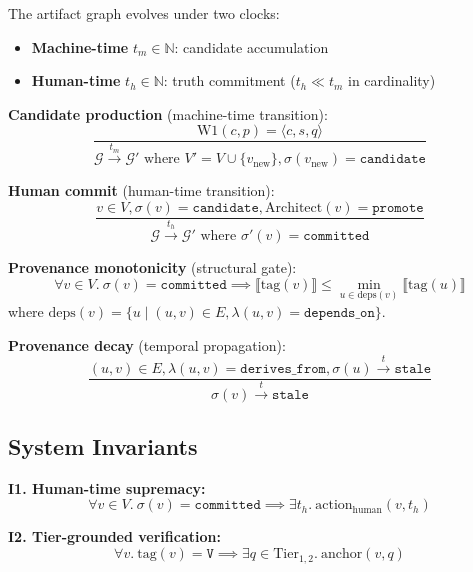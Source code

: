 The artifact graph evolves under two clocks:
\begin{itemize}
\item \textbf{Machine-time} $t_m \in \mathbb{N}$: candidate accumulation
\item \textbf{Human-time} $t_h \in \mathbb{N}$: truth commitment ($t_h \ll t_m$ in cardinality)
\end{itemize}

\textbf{Candidate production} (machine-time transition):
\begin{equation}
\frac{\text{W1}(c, p) = \langle c, s, q \rangle}
     {\mathcal{G} \xrightarrow{t_m} \mathcal{G}' \text{ where }
      V' = V \cup \{v_{\text{new}}\}, \sigma(v_{\text{new}}) = \mathtt{candidate}}
\end{equation}

\textbf{Human commit} (human-time transition):
\begin{equation}
\frac{v \in V, \sigma(v) = \mathtt{candidate}, \text{Architect}(v) = \texttt{promote}}
     {\mathcal{G} \xrightarrow{t_h} \mathcal{G}' \text{ where }
      \sigma'(v) = \mathtt{committed}}
\end{equation}

\textbf{Provenance monotonicity} (structural gate):
\begin{equation}
\forall v \in V.\ \sigma(v) = \mathtt{committed} \implies
  \llbracket \text{tag}(v) \rrbracket \leq
  \min_{u \in \text{deps}(v)} \llbracket \text{tag}(u) \rrbracket
\end{equation}
where $\text{deps}(v) = \{u \mid (u,v) \in E, \lambda(u,v) = \mathtt{depends\_on}\}$.

\textbf{Provenance decay} (temporal propagation):
\begin{equation}
\frac{(u,v) \in E, \lambda(u,v) = \mathtt{derives\_from},
      \sigma(u) \xrightarrow{t} \mathtt{stale}}
     {\sigma(v) \xrightarrow{t} \mathtt{stale}}
\end{equation}

\subsection{System Invariants}

\textbf{I1. Human-time supremacy:}
\begin{equation}
\forall v \in V.\ \sigma(v) = \mathtt{committed} \implies
  \exists t_h.\ \text{action}_{\text{human}}(v, t_h)
\end{equation}

\textbf{I2. Tier-grounded verification:}
\begin{equation}
\forall v.\ \text{tag}(v) = \mathtt{V} \implies
  \exists q \in \text{Tier}_{1,2}.\ \text{anchor}(v, q)
\end{equation}

